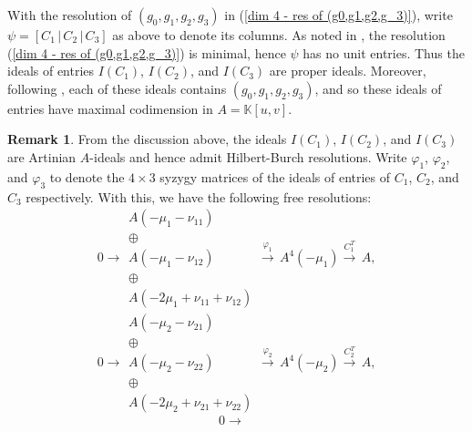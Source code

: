 \documentclass[reqno]{amsart}
\numberwithin{equation}{section}
\theoremstyle{definition}
\newtheorem{rem}[thm]{Remark}
\def\K{\mathbb{K}}
\begin{document}
With the resolution of $(g_0,g_1,g_2,g_3)$ in (\ref{dim 4 - res of (g0,g1,g2,g_3)}), write $\psi= [C_1\,|\, C_2\,|\,C_3]$ as above to denote its columns. As noted in , the resolution (\ref{dim 4 - res of (g0,g1,g2,g_3)}) is minimal, hence $\psi$ has no unit entries. Thus the ideals of entries $I(C_1)$, $I(C_2)$, and $I(C_3)$ are proper ideals. Moreover, following , each of these ideals contains $(g_0,g_1,g_2,g_3)$, and so these ideals of entries have maximal codimension in $A=\K[u,v]$.


\begin{rem}\label{dim 4 - I(C1) I(C2) I(C3) HB resolutions}
From the discussion above, the ideals $I(C_1)$, $I(C_2)$, and $I(C_3)$ are Artinian $A$-ideals and hence admit Hilbert-Burch resolutions. Write $\varphi_1$, $\varphi_2$, and $\varphi_3$ to denote the $4\times 3$ syzygy matrices of the ideals of entries of $C_1$, $C_2$, and $C_3$ respectively. With this, we have the following free resolutions:
\begin{equation}\label{dim 4 - res I(C1)}
     0 \longrightarrow \begin{array}{c}
 A(-\mu_1-\nu_{11})\\
 \oplus \\
A(-\mu_1-\nu_{12})\\
\oplus \\
A(-2\mu_1+\nu_{11}+\nu_{12})
\end{array} \overset{\varphi_1}{\longrightarrow} \,
A^4(-\mu_1)\overset{C_1^T}{\longrightarrow} \,
A,  
\end{equation}
\vspace{4mm}
 \begin{equation}\label{dim 4 - res I(C2)}
  0 \longrightarrow \begin{array}{c}
 A(-\mu_2-\nu_{21})\\
 \oplus \\
A(-\mu_2-\nu_{22})\\
\oplus \\
A(-2\mu_2+\nu_{21}+\nu_{22})
\end{array} \overset{\varphi_2}{\longrightarrow} \,
A^4(-\mu_2)\overset{C_2^T}{\longrightarrow} \,
A,
\end{equation}
\vspace{4mm}
\begin{equation}\label{dim 4 - res I(C3)}
 0 \longrightarrow \begin{array}{c}

\end{array}
\end{equation}
\end{rem}
\end{document}
